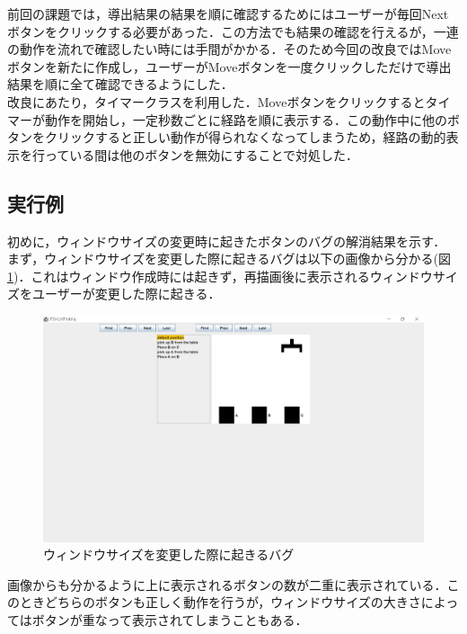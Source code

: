 \documentclass[12pt]{jarticle}
\begin{document}
前回の課題では，導出結果の結果を順に確認するためにはユーザーが毎回Nextボタンをクリックする必要があった．この方法でも結果の確認を行えるが，一連の動作を流れで確認したい時には手間がかかる．そのため今回の改良ではMoveボタンを新たに作成し，ユーザーがMoveボタンを一度クリックしただけで導出結果を順に全て確認できるようにした．\\

改良にあたり，タイマークラスを利用した．Moveボタンをクリックするとタイマーが動作を開始し，一定秒数ごとに経路を順に表示する．この動作中に他のボタンをクリックすると正しい動作が得られなくなってしまうため，経路の動的表示を行っている間は他のボタンを無効にすることで対処した．

\subsection{実行例}
初めに，ウィンドウサイズの変更時に起きたボタンのバグの解消結果を示す．\\
まず，ウィンドウサイズを変更した際に起きるバグは以下の画像から分かる(図\ref{fig:ButErr})．これはウィンドウ作成時には起きず，再描画後に表示されるウィンドウサイズをユーザーが変更した際に起きる．\\

\begin{figure}[htbp]
  \begin{center}
    \includegraphics[scale=0.4]{images/ButErr.PNG}
    \caption{ウィンドウサイズを変更した際に起きるバグ}
    \label{fig:ButErr}
  \end{center}
\end{figure}
画像からも分かるように上に表示されるボタンの数が二重に表示されている．このときどちらのボタンも正しく動作を行うが，ウィンドウサイズの大きさによってはボタンが重なって表示されてしまうこともある．\\
\end{document}
